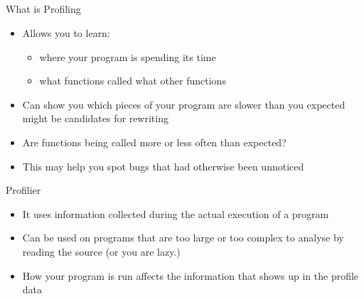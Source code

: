 \documentclass{beamer}
\begin{document}
\subsection{}
\begin{frame}{What is Profiling}
\begin{itemize}
\item Allows you to learn:
\begin{itemize}
\item where your program is spending its time
\item what functions called what other functions
\end{itemize}

\item Can show you which pieces of your program are slower than you expected might be candidates for rewriting

\item Are functions being called more or less often than expected? 

\item This may help you spot bugs that had otherwise been unnoticed
\end{itemize}
\end{frame}

\begin{frame}{Profilier}
\begin{itemize}
\item It uses information collected during the actual execution of a program
\item Can be used on programs that are too large or too complex to analyse by reading the source (or you are lazy.)
\item How your program is run affects the information that shows up in the profile data
\end{itemize}
\end{frame}
\end{document}
